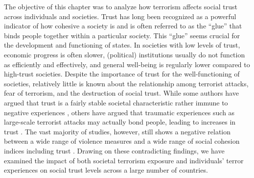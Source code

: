 The objective of this chapter was to analyze how terrorism affects social trust across individuals and societies. Trust has long been recognized as a powerful indicator of how cohesive a society is and is often referred to as the ``glue'' that binds people together within a particular society. This ``glue'' seems crucial for the development and functioning of states. In societies with low levels of trust, economic progress is often slower, (political) institutions usually do not function as efficiently and effectively, and general well-being is regularly lower compared to high-trust societies. Despite the importance of trust for the well-functioning of societies, relatively little is known about the relationship among terrorist attacks, fear of terrorism, and the destruction of social trust. While some authors have argued that trust is a fairly stable societal characteristic rather immune to negative experiences \citep{Bauer2015, Jones1996, Uslaner2002, Uslaner2008}, others have argued that traumatic experiences such as large-scale terrorist attacks may actually bond people, leading to increases in trust \citep{Calhoun2014, Putnam2002}. The vast majority of studies, however, still shows a negative relation between a wide range of violence measures and a wide range of social cohesion indices including trust \citep[e.g.,][]{Brehm1997a, Kijewski2016, Salmi2007}. Drawing on these contradicting findings, we have examined the impact of both societal terrorism exposure and individuals’ terror experiences on social trust levels across a large number of
countries.


